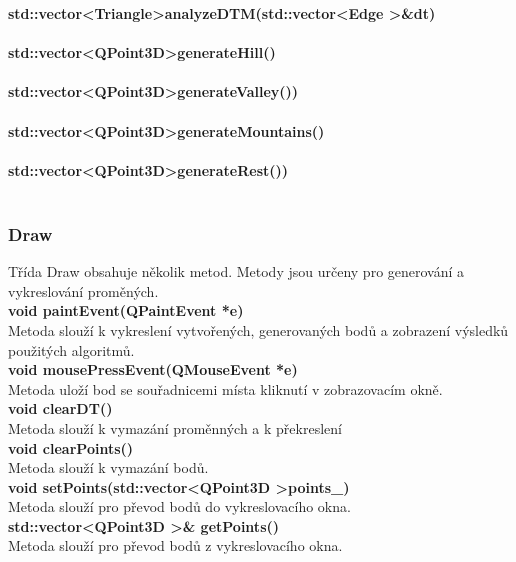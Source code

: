 \documentclass[a4paper, 12pt]{article}
\begin{document}
\textbf{std::vector\textless Triangle\textgreater analyzeDTM(std::vector\textless Edge \textgreater \&dt)}\\
\\

\textbf{std::vector\textless QPoint3D\textgreater generateHill()}\\
\\

\textbf{std::vector\textless QPoint3D\textgreater generateValley())}\\
\\

\textbf{std::vector\textless QPoint3D\textgreater generateMountains()}\\
\\

\textbf{std::vector\textless QPoint3D\textgreater generateRest())}\\
\\

\subsubsection{Draw}
Třída Draw obsahuje několik metod. Metody jsou určeny pro generování a vykreslování proměných.
\\

\textbf{void paintEvent(QPaintEvent *e)}\\
Metoda slouží k vykreslení vytvořených, generovaných bodů a zobrazení výsledků použitých algoritmů.
\\

\textbf{void mousePressEvent(QMouseEvent *e)}\\
Metoda uloží bod se souřadnicemi místa kliknutí v zobrazovacím okně.
\\

\textbf{void clearDT()}\\
Metoda slouží k vymazání proměnných a k překreslení
\\

\textbf{void clearPoints()}\\
Metoda slouží k vymazání bodů.
\\

\textbf{void setPoints(std::vector\textless QPoint3D \textgreater points\_)}\\
Metoda slouží pro převod bodů do vykreslovacího okna.\\

\textbf{std::vector\textless QPoint3D \textgreater \& getPoints()}\\
Metoda slouží pro převod bodů z vykreslovacího okna.\\
\end{document}
